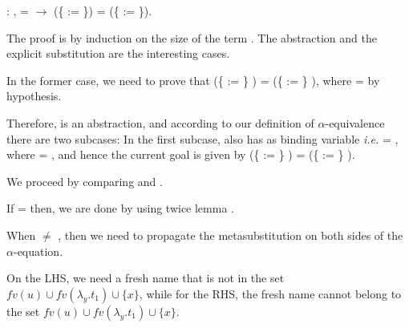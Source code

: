 \begin{coqdoccode}
\coqdocemptyline
\coqdocnoindent
{} : \coqdockw{\ensuremath{\forall}}    ,  =  \ensuremath{\rightarrow} (\{ := \}) = (\{ := \}).\coqdoceol
\end{coqdoccode}
 The proof is by induction on the size of the term . The abstraction and the explicit substitution are the interesting cases.
\begin{coqdoccode}
\end{coqdoccode}
In the former case, we need to prove that (\{ := \}   ) = (\{ := \} ), where    =  by hypothesis.\begin{coqdoccode}
 \end{coqdoccode}
Therefore,  is an abstraction, and according to our definition of $\alpha$-equivalence there are two subcases:  In the first subcase,  also has  as binding variable {\it i.e.}  =   , where  = , and hence the current goal is given by (\{ := \}   ) = (\{ := \}   ).
\begin{coqdoccode}
\end{coqdoccode}
We proceed by comparing  and .
\begin{coqdoccode}
\end{coqdoccode}
If  =  then, we are done by using twice lemma .
\begin{coqdoccode}
\end{coqdoccode}
When  \ensuremath{\not=} , then we need to propagate the metasubstitution on both sides of the $\alpha$-equation.\begin{coqdoccode}
 \end{coqdoccode}
On the LHS, we need a fresh name that is not in the set $fv(u)\cup fv(\lambda_y.t_1) \cup \{x\}$, while for the RHS, the fresh name cannot belong to the set $fv(u)\cup fv(\lambda_y.t_1) \cup \{x\}$.\begin{coqdoccode}
 \end{coqdoccode}
